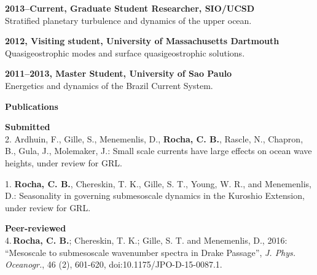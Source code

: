 \documentclass[a4paper,11pt,final]{memoir}
\newcommand{\Sep}{\vspace{1.25em}}
\newcommand{\SmallSep}{\vspace{0.5em}}
\newcommand{\CVSection}[1]
    {\Large\textbf{#1}\par
    \SmallSep\normalsize\normalfont}
\newcommand{\CVItem}[1]
    {\textbf{\color{NavyBlue} #1}}
\begin{document}
\CVItem{2013--Current, Graduate Student Researcher, SIO/UCSD}\\
Stratified planetary turbulence and dynamics of the upper ocean.
\SmallSep

\CVItem{2012, Visiting student, University of Massachusetts Dartmouth}\\
Quasigeostrophic modes and surface quasigeostrophic solutions.
\SmallSep

\CVItem{2011--2013, Master Student, University of Sao Paulo}\\
Energetics and dynamics of the Brazil Current System.


\Sep

\CVSection{Publications}

\CVItem{Submitted }\\






2. Ardhuin, F., Gille, S., Menemenlis, D., \textbf{Rocha, C. B.}, Rascle, N., Chapron, B., Gula, J., Molemaker, J.: Small scale currents have large effects on ocean wave heights, under review for GRL.

\SmallSep

1.  \textbf{Rocha, C. B.}, Chereskin, T. K., Gille, S. T., Young, W. R., and Menemenlis, D.: Seasonality in governing submesoscale dynamics in the Kuroshio Extension, under review for GRL.

\SmallSep

\CVItem{Peer-reviewed}\\

4.\,\textbf{Rocha, C. B.};  Chereskin, T. K.; Gille, S. T. and Menemenlis, D., 2016: ``Mesoscale to submesoscale wavenumber spectra in Drake Passage'', \textit{J. Phys. Oceanogr.}, 46 (2), 601-620, doi:10.1175/JPO-D-15-0087.1.
\end{document}

